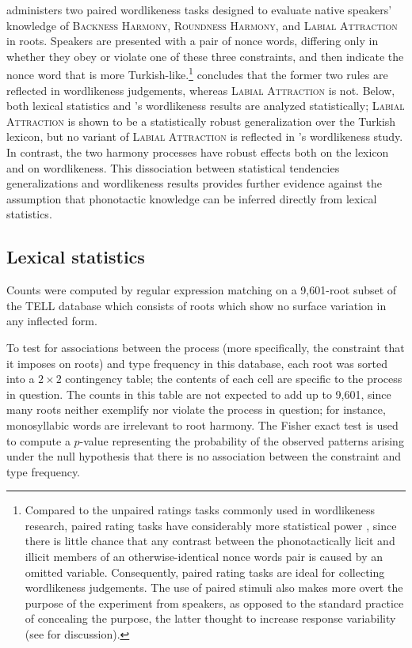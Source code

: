 \citet[311]{Zimmer1969} administers two paired wordlikeness tasks designed to evaluate native speakers' knowledge of \textsc{Backness Harmony}, \textsc{Roundness Harmony}, and \textsc{Labial Attraction} in roots. 
Speakers are presented with a pair of nonce words, differing only in whether they obey or violate one of these three constraints, and then indicate the nonce word that is more Turkish-like.\footnote{
    Compared to the unpaired ratings tasks  commonly used in wordlikeness research, paired rating tasks have considerably more statistical power \citep[e.g.][]{Gigerenzer2004}, since there is little chance that any contrast between the phonotactically licit and illicit members of an otherwise-identical nonce words pair is caused by an omitted variable.
    Consequently, paired rating tasks are ideal for collecting wordlikeness judgements.
    The use of paired stimuli also makes more overt the purpose of the experiment from speakers, as opposed to the standard practice of concealing the purpose, the latter thought to increase response variability (see \citealt[398f.]{Hertwig2001} for discussion).}
\citeauthor{Zimmer1969} concludes that the former two rules are reflected in wordlikeness judgements, whereas \textsc{Labial Attraction} is not. 
Below, both lexical statistics and \citeauthor{Zimmer1969}'s wordlikeness results are analyzed statistically; \textsc{Labial Attraction} is shown to be a statistically robust generalization over the Turkish lexicon, but no variant of \textsc{Labial Attraction} is reflected in \citeauthor{Zimmer1969}'s wordlikeness study. 
In contrast, the two harmony processes have robust effects both on the lexicon and on wordlikeness.  
This dissociation between statistical tendencies  generalizations and wordlikeness results provides further evidence against the assumption that phonotactic knowledge can be inferred directly from lexical statistics.

\subsection{Lexical statistics}

Counts were computed by regular expression matching on a 9,601-root subset of the TELL database which consists of roots which show no surface variation in any inflected form.

To test for associations between the process (more specifically, the constraint that it imposes on roots) and type frequency in this database, each root was sorted into a $2 \times 2$ contingency table; the contents of each cell are specific to the process in question. The counts in this table are not expected to add up to 9,601, since many roots neither exemplify nor violate the process in question; for instance, monosyllabic words are irrelevant to root harmony. The Fisher exact test is used to compute a $p$-value representing the probability of the observed patterns arising under the null hypothesis that there is no association between the constraint and type frequency.

